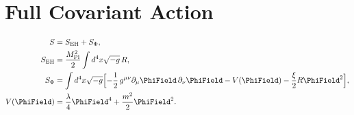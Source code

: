 \section{Full Covariant Action}\label{sec:action}


\begin{align}
S &= S_{\text{EH}} + S_{\Phi}, \\
S_{\text{EH}} &= \frac{\Mpl^{2}}{2}\int d^{4}x\sqrt{-g}\,R, \\
S_{\Phi} &= \int d^{4}x\sqrt{-g}\Bigl[
  -\frac12\,g^{\mu\nu}\partial_\mu\PhiField\,\partial_\nu\PhiField
  - V(\PhiField) - \frac{\xi}{2} R\PhiField^{2}
\Bigr], \\
V(\PhiField) &= \frac{\lambda}{4}\PhiField^{4} + \frac{m^{2}}{2}\PhiField^{2}.
\end{align}
